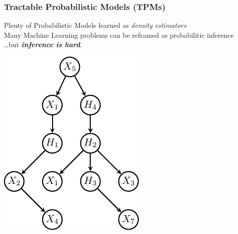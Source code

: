 \documentclass[xcolor={usenames,dvipsnames,svgnames}, compress]{beamer}
\newcommand{\cmark}{\ding{51}}%
\begin{document}
\begin{frame}[t]
  \frametitle{Tractable Probabilistic Models (TPMs)}
  \small
  Plenty of Probabilistic Models learned as \emph{density estimators}\\[6pt]
  
  Many Machine Learning problems can be reframed as probabilitic
  inference\\[6pt]
   
   \dots but \emph{\textbf{inference is hard}}.
   \begin{center}
    \begin{minipage}[t]{0.29\linewidth}
      \begin{center}
        \includegraphics[width=0.8\linewidth]{figures/tree}\\

\end{center}
\end{minipage}
\end{center}
\end{frame}
\end{document}
